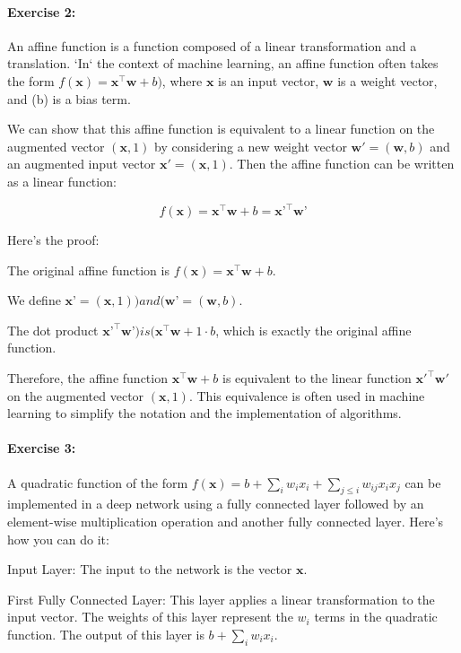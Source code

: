 \paragraph{Exercise 2:}

An affine function is a function composed of a linear transformation and a translation.
`In` the context of machine learning, an affine function often takes the form \(f(\mathbf{x}) = \mathbf{x}^\top \mathbf{w} + b)\), where \(\mathbf{x}\) is an input vector, \(\mathbf{w}\) is a weight vector, and (b) is a bias term.

We can show that this affine function is equivalent to a linear function on the augmented vector \((\mathbf{x}, 1)\) by considering a new weight vector \(\mathbf{w}' = (\mathbf{w}, b)\) and an augmented input vector \(\mathbf{x}' = (\mathbf{x}, 1)\). Then the affine function can be written as a linear function:

$$
f(\mathbf{x}) = \mathbf{x}^\top \mathbf{w} + b = \mathbf{x}’^\top \mathbf{w}’
$$

Here’s the proof:

The original affine function is \(f(\mathbf{x}) = \mathbf{x}^\top \mathbf{w} + b\).

We define \(\mathbf{x}’ = (\mathbf{x}, 1)) and (\mathbf{w}’ = (\mathbf{w}, b)\).

The dot product \(\mathbf{x}’^\top \mathbf{w}’) is (\mathbf{x}^\top \mathbf{w} + 1 \cdot b\), which is exactly the original affine function.

Therefore, the affine function \(\mathbf{x}^\top \mathbf{w} + b\) is equivalent to the linear function \(\mathbf{x}'^\top \mathbf{w}'\) on the augmented vector \((\mathbf{x}, 1)\).
This equivalence is often used in machine learning to simplify the notation and the implementation of algorithms.

\paragraph{Exercise 3:}

A quadratic function of the form \(f(\mathbf{x}) = b + \sum_i w_i x_i + \sum_{j \leq i} w_{ij} x_{i} x_{j}\) can be implemented in a deep network using a fully connected layer followed by an element-wise multiplication operation and another fully connected layer.
Here’s how you can do it:

Input Layer: The input to the network is the vector \(\mathbf{x}\).

First Fully Connected Layer: This layer applies a linear transformation to the input vector.
The weights of this layer represent the \(w_i\) terms in the quadratic function. The output of this layer is \(b + \sum_i w_i x_i\).

